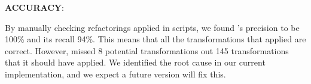 \documentclass{sigplanconf}
\begin{document}
\textbf{ACCURACY}: 

By manually checking refactorings applied in \numManual scripts, we found \tool's precision to be 100\% and its recall 94\%. This means that all the transformations that \tool applied are correct. However, \tool missed 8 potential transformations out 145 transformations that it should have applied. We identified the root cause in our current implementation, and we expect a future version will fix this.

%
\end{document}
